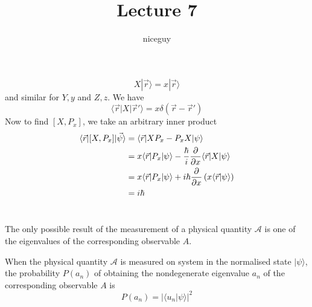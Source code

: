 \documentclass[12pt]{article}
\title{Lecture 7}
\author{niceguy}
\begin{document}
\maketitle

\section{}

$$X|\vec r \rangle = x|\vec r \rangle$$
and similar for $Y,y$ and $Z,z$. We have
$$\langle \vec r |X|\vec r' \rangle = x\delta(\vec r - \vec r')$$
Now to find $[X,P_x]$, we take an arbitrary inner product
\begin{align*}
    \langle \vec r | [X,P_x] | \vec \psi \rangle &= \langle \vec r | XP_x - P_xX | \psi \rangle \\
                                                 &= x\langle \vec r |P_x|\psi \rangle - \frac{\hbar}{i} \frac{\partial }{\partial x} \langle \vec r | X | \psi \rangle \\
                                                 &= x\langle \vec r |P_x|\psi \rangle + i\hbar \frac{\partial }{\partial x} \left(x\langle \vec r|\psi\rangle\right) \\
                                                 &= i\hbar
\end{align*}

\section{}

The only possible result of the measurement of a physical quantity $\mathcal A$ is one of the eigenvalues of the corresponding observable $A$.

When the physical quantity $\mathcal A$ is measured on system in the normalised state $|\psi\rangle$, the probability $P(a_n)$ of obtaining the nondegenerate eigenvalue $a_n$ of the corresponding observable $A$ is
$$P(a_n) = |\langle u_n|\psi\rangle|^2$$
\end{document}
